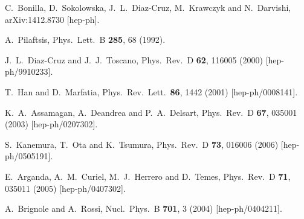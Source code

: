 \documentclass[aps,prd,groupaddress,floatfix,tighten,nofootinbib,showpacs,
amsfonts,superscriptaddress]{revtex4}
\begin{document}
{\begin{thebibliography}{99}
  C.~Bonilla, D.~Sokolowska, J.~L.~Diaz-Cruz, M.~Krawczyk and N.~Darvishi,
  arXiv:1412.8730 [hep-ph].
    
  A.~Pilaftsis,
  Phys.\ Lett.\ B {\bf 285}, 68 (1992).

  J.~L.~Diaz-Cruz and J.~J.~Toscano,
  Phys.\ Rev.\ D {\bf 62}, 116005 (2000)
  [hep-ph/9910233].
  
  T.~Han and D.~Marfatia,
  Phys.\ Rev.\ Lett.\  {\bf 86}, 1442 (2001)
  [hep-ph/0008141].
  
  K.~A.~Assamagan, A.~Deandrea and P.~A.~Delsart,
  Phys.\ Rev.\ D {\bf 67}, 035001 (2003)
  [hep-ph/0207302].

  S.~Kanemura, T.~Ota and K.~Tsumura,
  Phys.\ Rev.\ D {\bf 73}, 016006 (2006)
  [hep-ph/0505191].
  
    
  
  E.~Arganda, A.~M.~Curiel, M.~J.~Herrero and D.~Temes,
  Phys.\ Rev.\ D {\bf 71}, 035011 (2005)
  [hep-ph/0407302].

  
  
  A.~Brignole and A.~Rossi,
  Nucl.\ Phys.\ B {\bf 701}, 3 (2004)
  [hep-ph/0404211].
  

\end{thebibliography}}
\end{document}
